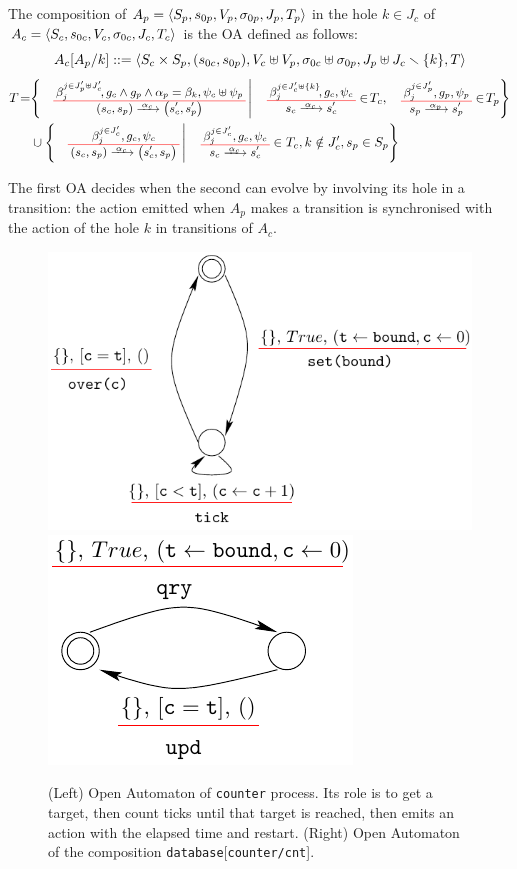 \documentclass[runningheads]{llncs}
\begin{document}
\begin{definition} \label{Def:CompOA}
The composition of \(A_p = \OAg[p]\) in the hole \(k \in J_c\) of    \(A_c = \OAg[c]\) is the OA defined as follows:
\[A_c\subst{A_p}{k} ::=  \OA{S_c \times S_p}{\mpar{s_{0c}, s_{0p}}}{V_c \uplus V_p}{\sigma_{0c} \uplus \sigma_{0p}}{J_p \uplus J_c \setminus \mbrc{k}}{T} \] 
\begin{align*}
T\!=& \mset{\OT{\mpar{s_c, s_p}}{\mpar{s'_c, s'_p}}{\alpha_c}{\beta_j^{j \in J'_p \uplus J'_c}\!}{g_c \wedge g_p \wedge \alpha_p = \beta_k}{\psi_c \uplus \psi_p}}{ \OT{s_c}{s'_c}{\alpha_c}{\beta_j^{j \in J'_c \uplus \mbrc{k} }\!}{g_c}{\psi_c} \in\! T_c, \OTx{p}{}{}{p} \in\! T_p} \\
	& \cup \mset{\OT{\mpar{s_c, s_p}}{\mpar{s'_c, s_p}}{\alpha_c}{\beta_j^{j \in J'_c}}{g_c}{\psi_c}}{\OTx{c}{}{}{c} \in T_c, k \notin J'_c, s_p \in S_p}
\end{align*}
\end{definition}

The first OA decides when the second can evolve by involving its hole in a transition:
the action emitted when \(A_p\) makes a transition is synchronised with the action of the hole \(k\) in transitions of \(A_c\).

\begin{figure}[h]
 \centering
   \includegraphics[width=.55\textwidth]{Figures/counter.pdf}\hfill 
   \includegraphics[width=.35\textwidth]{Figures/compose_count_db.pdf}
   \caption{(Left) Open Automaton of \texttt{counter} process.  Its role is to get a target, then count ticks until that target is reached, then emits an action with the elapsed time and restart. (Right) Open Automaton of the composition \texttt{database}[\texttt{counter/cnt}].\label{Fig:counter}}
\end{figure}
\end{document}
